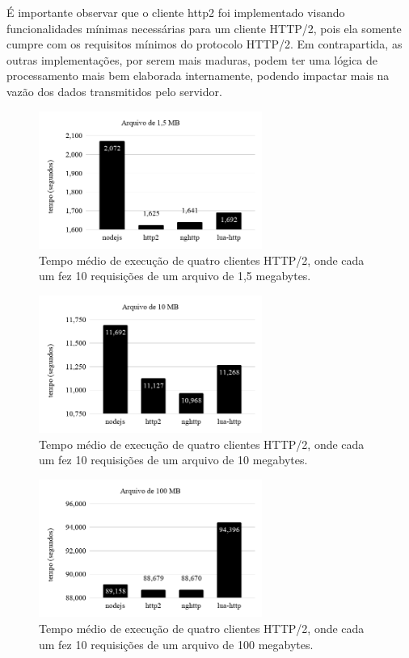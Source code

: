É importante observar que o cliente http2 foi implementado visando funcionalidades mínimas necessárias para um cliente HTTP/2, pois ela somente cumpre com os requisitos mínimos do protocolo HTTP/2. Em contrapartida, as outras implementações, por serem mais maduras, podem ter uma lógica de processamento mais bem elaborada internamente, podendo impactar mais na vazão dos dados transmitidos pelo servidor.

\begin{figure}[hbt!]
 \centering
  \includegraphics[width=0.65\textwidth]{./fig/1,5MB}
 \caption{Tempo médio de execução de quatro clientes HTTP/2, onde cada um fez 10 requisições de um arquivo de 1,5 megabytes.}
 \label{fig:1,5MB}
\end{figure}

\begin{figure}[hbt!]
 \centering
  \includegraphics[width=0.65\textwidth]{./fig/10MB}
 \caption{Tempo médio de execução de quatro clientes HTTP/2, onde cada um fez 10 requisições de um arquivo de 10 megabytes.}
 \label{fig:10MB}
\end{figure}

\begin{figure}[hbt!]
 \centering
  \includegraphics[width=0.65\textwidth]{./fig/100MB}
 \caption{Tempo médio de execução de quatro clientes HTTP/2, onde cada um fez 10 requisições de um arquivo de 100 megabytes.}
 \label{fig:100MB}
\end{figure}